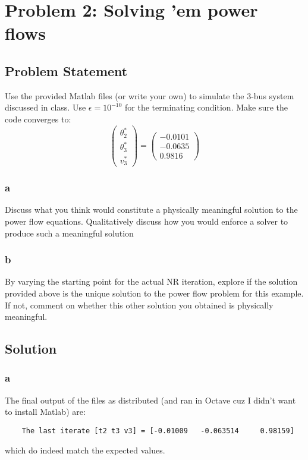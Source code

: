 \documentclass[11pt]{report}
\theoremstyle{definition}
\begin{document}

\newpage
\section*{Problem 2: Solving 'em power flows}
\subsection*{Problem Statement}
Use the provided Matlab files (or write your own) to simulate the 3-bus system
discussed in class. Use $\epsilon=10^{-10}$ for the terminating condition. Make
sure the code converges to:
\[
	\begin{pmatrix}
		\theta_2^* \\ \theta_3^* \\ v_3^*
	\end{pmatrix}
	=
	\begin{pmatrix}
		-0.0101 \\ -0.0635 \\ 0.9816
	\end{pmatrix}
\]

\subsubsection*{a}
Discuss what you think would constitute a physically meaningful solution to the
power flow equations.  Qualitatively discuss how you would enforce a solver to
produce such a meaningful solution
\subsubsection*{b}
By varying the starting point for the actual NR iteration, explore if the
solution provided above is the unique solution to the power flow problem for
this example. If not, comment on whether this other solution you obtained is
physically meaningful.

\subsection*{Solution}
\subsubsection*{a}
The final output of the files as distributed (and ran in Octave cuz I didn't
want to install Matlab) are:
\begin{verbatim}
	The last iterate [t2 t3 v3] = [-0.01009   -0.063514     0.98159]
\end{verbatim}
which do indeed match the expected values.
\end{document}
